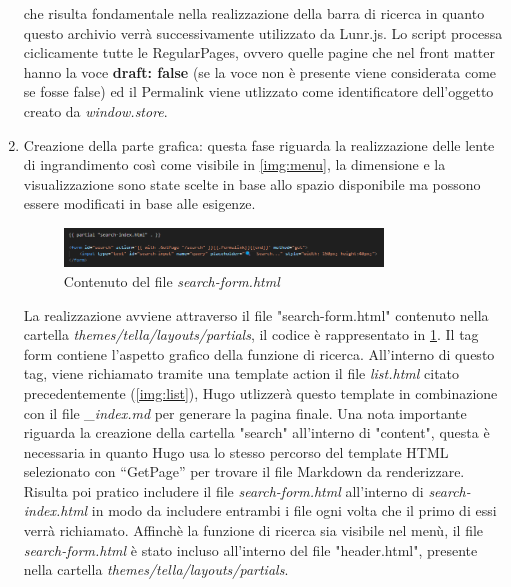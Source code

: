 \documentclass[target=bach,aauheader=]{thud}
\begin{document}
\begin{enumerate}
    che risulta fondamentale nella realizzazione della barra di ricerca in quanto questo archivio verrà successivamente utilizzato da Lunr.js.
    \newline 
    Lo script processa ciclicamente tutte le RegularPages, ovvero quelle pagine che nel front matter hanno la voce \textbf{draft: false} (se la voce non è presente viene considerata come se fosse false) ed il Permalink viene utlizzato come identificatore dell'oggetto creato da \textit{window.store}.
    \item Creazione della parte grafica: questa fase riguarda la realizzazione delle lente di ingrandimento così come visibile in \cref{img:menu}, la dimensione e la visualizzazione sono state scelte in base allo spazio disponibile ma possono essere modificati in base alle esigenze.
    \newline
    \begin{figure}
        \centering
        \includegraphics[width = 0.8\textwidth]{images/search-form.png}
        \caption{Contenuto del file \textit{search-form.html}}
        \label{img:form}
    \end{figure}
    \newline
    La realizzazione avviene attraverso il file "search-form.html" contenuto nella cartella 
    \newline \textit{themes/tella/layouts/partials}, il codice è rappresentato in \cref{img:form}.
    Il tag form contiene l'aspetto grafico della funzione di ricerca. All'interno di questo tag, viene richiamato tramite una template action il file \textit{list.html} citato precedentemente (\cref{img:list}), Hugo utlizzerà questo template in combinazione con il file \textit{\_index.md} per generare la pagina finale. 
    \newline \newline 
    Una nota importante riguarda la creazione della cartella "search" all'interno di "content", questa è necessaria in quanto Hugo usa lo stesso percorso del template HTML selezionato con “GetPage” per trovare il file Markdown da renderizzare. 
    Risulta poi pratico includere il file \textit{search-form.html} all'interno di \textit{search-index.html} in modo da includere entrambi i file ogni volta che il primo di essi verrà richiamato. 
    \newline
    Affinchè la funzione di ricerca sia visibile nel menù, il file \textit{search-form.html} è stato incluso all'interno del file "header.html", presente nella cartella \textit{themes/tella/layouts/partials}.

\end{enumerate}
\end{document}

